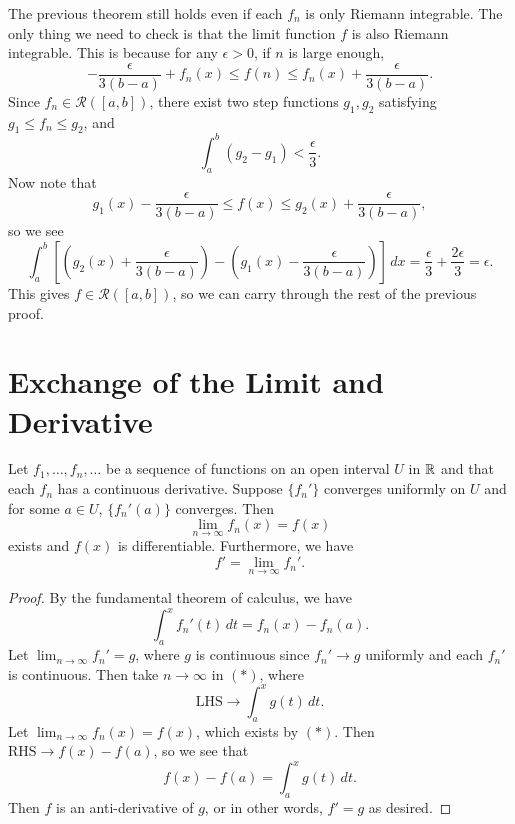 \begin{remark}
  The previous theorem still holds even if each $f_n$
  is only Riemann integrable. The only thing we need to
  check is that the limit function $f$ is
  also Riemann integrable. This is because for
  any $\epsilon > 0$, if $n$ is large enough,
  \[
    -\frac{\epsilon}{3(b - a)} + f_n(x) \le f(n) \le f_n(x) + \frac{\epsilon}{3(b - a)}.
  \]
  Since $f_n \in \mathcal{R}([a, b])$, there exist
  two step functions $g_1, g_2$ satisfying
  $g_1 \le f_n \le g_2$, and
  \[
    \int_a^b (g_2 - g_1) < \frac{\epsilon}{3}.
  \]
  Now note that
  \[
    g_1(x) - \frac{\epsilon}{3(b - a)} \le f(x) \le g_2(x) + \frac{\epsilon}{3(b - a)},
  \]
  so we see
  \[
    \int_a^b \left[\left(g_2(x) + \frac{\epsilon}{3(b - a)}\right) - \left(g_1(x) - \frac{\epsilon}{3(b - a)}\right)\right] \, dx
    = \frac{\epsilon}{3} + \frac{2\epsilon}{3} = \epsilon.
  \]
  This gives $f \in \mathcal{R}([a, b])$, so we
  can carry through the rest of the previous proof.
\end{remark}

\section{Exchange of the Limit and Derivative}
\begin{theorem}
  \label{thm:exchange-limit-derivative}
  Let $f_1, \dots, f_n, \dots$ be a sequence of functions
  on an open interval $U$ in $\mathbb{R}$ and that each $f_n$ has
  a continuous derivative. Suppose $\{f_n'\}$ converges
  uniformly on $U$ and for some $a \in U$,
  $\{f_n'(a)\}$ converges. Then
  \[
    \lim_{n \to \infty} f_n(x) = f(x)
  \]
  exists and $f(x)$ is differentiable. Furthermore,
  we have
  \[
    f' = \lim_{n \to \infty} f_n'.
  \]
\end{theorem}

\begin{proof}
  By the fundamental theorem of calculus, we have
  \[
    \int_a^x f_n'(t)\, dt = f_n(x) - f_n(a). \tag{$*$}
  \]
  Let $\lim_{n \to \infty} f_n' = g$, where $g$ is
  continuous since $f_n' \to g$ uniformly and
  each $f_n'$ is continuous. Then take $n \to \infty$
  in $(*)$, where
  \[
    \text{LHS} \to \int_a^x g(t)\, dt.
  \]
  Let $\lim_{n \to \infty} f_n(x) = f(x)$, which
  exists by $(*)$. Then
  $\text{RHS} \to f(x) - f(a)$,
  so we see that
  \[
    f(x) - f(a) = \int_a^x g(t)\, dt.
  \]
  Then $f$ is an anti-derivative of $g$, or in other
  words, $f' = g$ as desired.
\end{proof}

